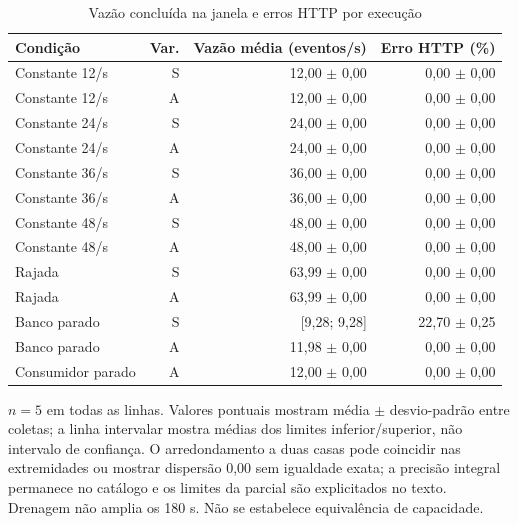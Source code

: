 \begin{table}[htbp]
\centering
\caption{Vazão concluída na janela e erros HTTP por execução}
\label{tab:final-vazao}
\small
\setlength{\tabcolsep}{4pt}
\begin{tabular}{lrrr}
\hline
Condição & Var. & Vazão média (eventos/s) & Erro HTTP (\%) \\ \hline
Constante 12/s & S & 12,00 $\pm$ 0,00 & 0,00 $\pm$ 0,00 \\
Constante 12/s & A & 12,00 $\pm$ 0,00 & 0,00 $\pm$ 0,00 \\
Constante 24/s & S & 24,00 $\pm$ 0,00 & 0,00 $\pm$ 0,00 \\
Constante 24/s & A & 24,00 $\pm$ 0,00 & 0,00 $\pm$ 0,00 \\
Constante 36/s & S & 36,00 $\pm$ 0,00 & 0,00 $\pm$ 0,00 \\
Constante 36/s & A & 36,00 $\pm$ 0,00 & 0,00 $\pm$ 0,00 \\
Constante 48/s & S & 48,00 $\pm$ 0,00 & 0,00 $\pm$ 0,00 \\
Constante 48/s & A & 48,00 $\pm$ 0,00 & 0,00 $\pm$ 0,00 \\
Rajada & S & 63,99 $\pm$ 0,00 & 0,00 $\pm$ 0,00 \\
Rajada & A & 63,99 $\pm$ 0,00 & 0,00 $\pm$ 0,00 \\
Banco parado & S & [9,28; 9,28] & 22,70 $\pm$ 0,25 \\
Banco parado & A & 11,98 $\pm$ 0,00 & 0,00 $\pm$ 0,00 \\
Consumidor parado & A & 12,00 $\pm$ 0,00 & 0,00 $\pm$ 0,00 \\
\hline
\end{tabular}
\vspace{0.2cm}
\begin{minipage}{\textwidth}
\footnotesize
$n=5$ em todas as linhas. Valores pontuais mostram média $\pm$ desvio-padrão entre coletas; a linha intervalar mostra médias dos limites inferior/superior, não intervalo de confiança. O arredondamento a duas casas pode coincidir nas extremidades ou mostrar dispersão 0,00 sem igualdade exata; a precisão integral permanece no catálogo e os limites da parcial são explicitados no texto. Drenagem não amplia os 180 s. Não se estabelece equivalência de capacidade.
\end{minipage}
\end{table}
